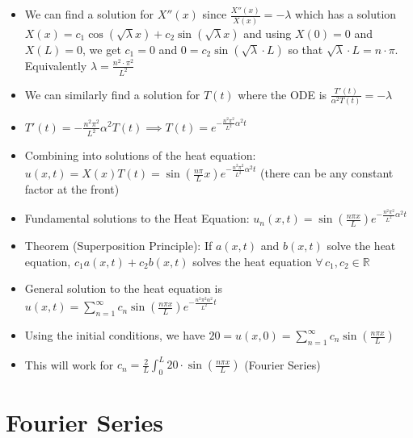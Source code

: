 \documentclass[12pt]{article}
\begin{document}
\begin{itemize}
\begin{itemize}
        \item We can find a solution for $X''(x)$ since $\frac{X''(x)}{X(x)} = - \lambda$ which has a solution $X(x) = c_1 \cos (\sqrt{\lambda} x) + c_2 \sin (\sqrt{\lambda} x)$ and using $X(0) = 0$ and $X(L) = 0$, we get $c_1 =0$ and $0 = c_2 \sin (\sqrt{\lambda} \cdot L)$ so that $\sqrt{\lambda} \cdot L = n \cdot \pi$. Equivalently $\lambda = \frac{n^2 \cdot \pi^2}{L^2}$
        \item We can similarly find a solution for $T(t)$ where the ODE is $\frac{T'(t)}{\alpha^2 T(t)} = - \lambda$
        \item $T'(t) = - \frac{n^2 \pi^2}{L^2} \alpha^2 T(t) \implies T(t) = e^{- \frac{n^2 \pi^2}{L^2} \alpha^2 t}$
        \item Combining into solutions of the heat equation: $u(x,t) = X(x) T(t) = \sin (\frac{n \pi}{L} x) e^{- \frac{n^2 \pi^2}{L^2} \alpha^2 t}$ (there can be any constant factor at the front)
        \item Fundamental solutions to the Heat Equation: $u_n (x,t) = \sin (\frac{n \pi x}{L}) e^{- \frac{n^2 \pi^2}{L^2} \alpha^2 t}$
        \item Theorem (Superposition Principle): If $a(x,t)$ and $b(x,t)$ solve the heat equation, $c_1 a(x,t) + c_2 b(x,t)$ solves the heat equation $\forall \, c_1, c_2 \in \mathbb{R}$
        \item General solution to the heat equation is $u(x,t) = \sum_{n=1}^{\infty} c_n \sin (\frac{n \pi x}{L}) e^{- \frac{n^2 \pi ^2 \alpha^2}{L^2} t}$
        \item Using the initial conditions, we have $20 = u(x,0) = \sum_{n=1}^{\infty} c_n \sin (\frac{n \pi x}{L})$
        \item This will work for $c_n = \frac{2}{L} \int_{0}^{L} 20 \cdot \sin (\frac{n \pi x}{L})$ (Fourier Series)
    \end{itemize}
\end{itemize}

\section{Fourier Series}
\end{document}
